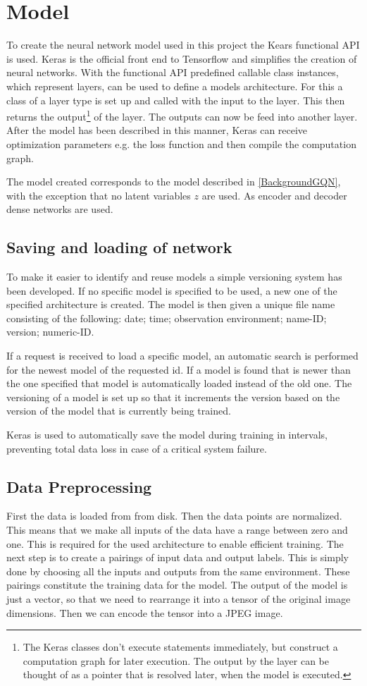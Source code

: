 \section{Model}
To create the neural network model used in this project the Kears functional API is used. Keras is the official front end to Tensorflow and simplifies the creation of neural networks. With the functional API predefined callable class instances, which represent layers, can be used to define a models architecture. For this a class of a layer type is set up and called with the input to the layer. This then returns the output\footnote{The Keras classes don't execute statements immediately, but construct a computation graph for later execution. The output by the layer can be thought of as a pointer that is resolved later, when the model is executed.} of the layer. The outputs can now be feed into another layer. After the model has been described in this manner, Keras can receive optimization parameters e.g. the loss function and then compile the computation graph.

The model created corresponds to the model described in \cref{BackgroundGQN}, with the exception that no latent variables $z$ are used. As encoder and decoder dense networks are used.


\subsection{Saving and loading of network}
To make it easier to identify and reuse models a simple versioning system has been developed. If no specific model is specified to be used, a new one of the specified architecture is created. The model is then given a unique file name consisting of the following: date; time; observation environment; name-ID; version; numeric-ID.

If a request is received to load a specific model, an automatic search is performed for the newest model of the requested id. If a model is found that is newer than the one specified that model is automatically loaded instead of the old one. The versioning of a model is set up so that it increments the version based on the version of the model that is currently being trained.

Keras is used to automatically save the model during training in intervals, preventing total data loss in case of a critical system failure.


\subsection{Data Preprocessing}
First the data is loaded from from disk. Then the data points are normalized. This means that we make all inputs of the data have a range between zero and one. This is required for the used architecture to enable efficient training. The next step is to create a pairings of input data and output labels. This is simply done by choosing all the inputs and outputs from the same environment. These pairings constitute the training data for the model. The output of the model is just a vector, so that we need to rearrange it into a tensor of the original image dimensions. Then we can encode the tensor into a JPEG image.


